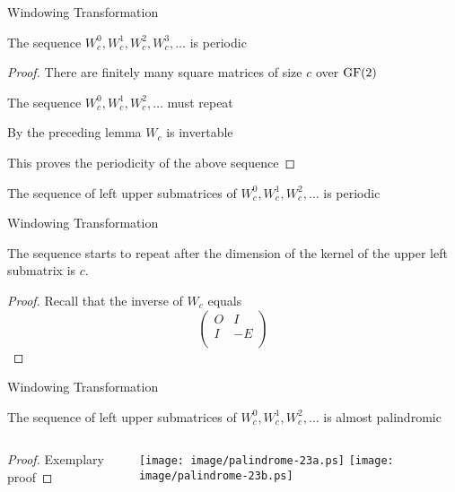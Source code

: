 \begin{frame}{Windowing Transformation}
	\begin{theorem}
		The sequence $W_{c}^{0}, W_{c}^{1}, W_{c}^{2}, W_{c}^{3}, \ldots$ is
		periodic
	\end{theorem}
	
	\pause
	\bigskip
	
	\begin{proof}
		There are finitely many square matrices of size $c$ over $\operatorname{GF}(2)$
		
		The sequence $W_{c}^{0}, W_{c}^{1}, W_{c}^{2},\ldots$ must repeat
		
		By the preceding lemma $W_{c}$ is invertable
		
		This proves the periodicity of the above sequence
	\end{proof}
	
	\pause
	\bigskip
	
	\begin{corollary}
		The sequence of left upper submatrices of
		$W_{c}^{0}, W_{c}^{1}, W_{c}^{2},\ldots$ is periodic
	\end{corollary}
\end{frame}

\begin{frame}{Windowing Transformation}
	\begin{lemma}
		The sequence starts to repeat after the dimension of the kernel of the
		upper left submatrix is $c$.
	\end{lemma}
	
	\pause
	\bigskip
	
	\begin{proof}
		Recall that the inverse of $W_{c}$ equals
		\[
			\left(
			\begin{array}{cc}
				O & I  \\
				I & -E \\
			\end{array}
			\right)
		\]
	\end{proof}
\end{frame}

\begin{frame}{Windowing Transformation}
	\begin{lemma}
		The sequence of left upper submatrices of
		$W_{c}^{0}, W_{c}^{1}, W_{c}^{2},\ldots$ is almost palindromic		
	\end{lemma}
	
	\pause
	\bigskip
	
	\begin{columns}[T]
		\begin{column}{0.45\textwidth}
			\begin{proof}
				Exemplary proof
			\end{proof}
		\end{column}
		\begin{column}{0.45\textwidth}
			\hfill
			\texttt{[image: image/palindrome-23a.ps]}
			\hfill
			\texttt{[image: image/palindrome-23b.ps]}
			\hspace*{\fill}
		\end{column}
	\end{columns}
\end{frame}

